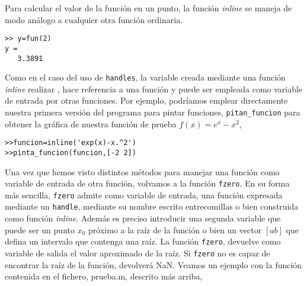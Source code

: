 Para calcular el valor de la función en un punto, la función \emph{inline} se maneja de  modo análogo a cualquier otra función ordinaria.

\begin{verbatim}
>> y=fun(2)
y =
   3.3891
\end{verbatim}

Como en el caso del uso de \texttt{handles}, la variable creada mediante una función \emph{inline} realizar , hace referencia a una función y puede ser empleada como variable  de entrada por otras funciones. Por ejemplo, podríamos emplear directamente nuestra primera versión del programa para pintar funciones, \texttt{pitan\_funcion} para obtener la gráfica de nuestra función de prueba $f(x)=e^x-x^2$,

\begin{verbatim}
>>funcion=inline('exp(x)-x.^2')
>>pinta_funcion(funcion,[-2 2])
\end{verbatim}

Una vez que hemos visto distintos métodos para manejar una función como variable de entrada de otra función, volvamos a la función \texttt{fzero}. En su forma más sencilla, \texttt{fzero} admite como variable de entrada, una función expresada mediante un \texttt{handle}, mediante su nombre escrito entrecomillas o bien construida como función \emph{inline}. Además es preciso introducir una segunda variable que puede ser un punto $x_0$ próximo a la raíz de la función o bien un vector $[a b]$ que defina un intervalo que contenga una raíz. La función \texttt{fzero}, devuelve como variable de salida el valor aproximado de la raíz. Si \texttt{fzero} no es capaz de encontrar la raíz de la función, devolverá NaN. Veamos un ejemplo con la función contenida en el fichero, prueba.m, descrito más arriba,

